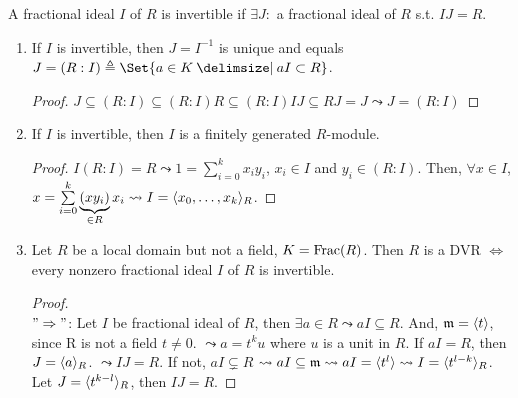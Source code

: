 \begin{definition}
  A fractional ideal $I$ of $R$ is invertible if $\exists J:$ a fractional ideal
  of $R$ s.t. $IJ = R$.
\end{definition}

\begin{prop}\mbox{}
  \begin{enumerate}
    \item If $I$ is invertible, then $J = I^{-1}$ is unique and equals
      $J = (R:I) \triangleq \Set{a \in K \given aI \subset R}$.
      \begin{proof}
        $ J \subseteq (R:I) \subseteq (R:I)R \subseteq (R:I)IJ \subseteq RJ = J
        \leadsto J = (R:I) $
      \end{proof}
    \item If $I$ is invertible, then $I$ is a finitely generated $R$-module.
      \begin{proof}
        $I(R:I) = R \leadsto 1 = \sum\limits_{i = 0}^{k} x_iy_i$, $x_i \in I$ and
        $y_i \in (R:I)$. Then, $\forall x \in I$, $x = \sum\limits_{i = 0}^{k} 
        \underbrace{(xy_i)}_{\in R}x_i \leadsto I = \langle x_0, \dots, x_k\rangle_R$.
      \end{proof}
    \item Let $R$ be a local domain but not a field, $K = \operatorname{Frac}(R)$.
      Then $R$ is a DVR $\iff$ every nonzero fractional ideal $I$ of $R$ is
      invertible.
      \begin{proof} $ $\\
        $"\Rightarrow"$:
        Let $I$ be fractional ideal of $R$, then $\exists a \in R \leadsto aI 
        \subseteq R$. And, $\mathfrak{m} = \langle t\rangle$, since R is not a field $t \ne 0$.
        $\leadsto a = t^k u$ where $u$ is a unit in $R$.
        If $aI = R$, then $J = \langle a\rangle_R$. $\leadsto IJ = R$. If not,
        $aI \subsetneq R$ $\leadsto aI \subseteq \mathfrak{m} \leadsto aI = \langle t^l\rangle
        \leadsto I = \langle t^{l - k}\rangle_R$. Let $J = \langle t^{k - l}\rangle_R$, then $IJ
         = R$.


\end{proof}
\end{enumerate}
\end{prop}
